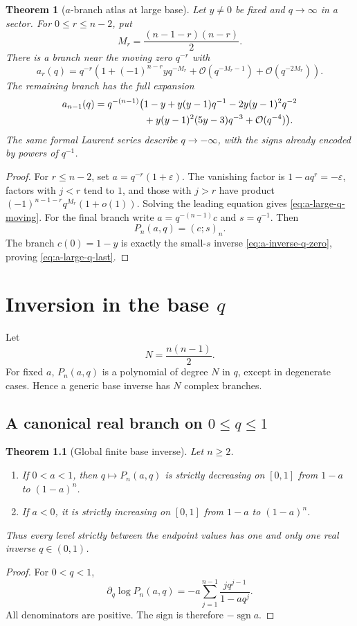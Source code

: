 \documentclass[11pt,oneside]{book}
\newtheorem{theorem}{Theorem}[chapter]
\theoremstyle{definition}
\theoremstyle{remark}
\newcommand{\OO}{\mathcal{O}}
\newcommand{\eps}{\varepsilon}
\begin{document}
\begin{theorem}[$a$-branch atlas at large base]\label{thm:a-branches-infty}
Let $y\ne0$ be fixed and $q\to\infty$ in a sector.  For
$0\le r\le n-2$, put
\[
 M_r=\frac{(n-1-r)(n-r)}2.
\]
There is a branch near the moving zero $q^{-r}$ with
\begin{equation}\label{eq:a-large-q-moving}
 a_r(q)=q^{-r}\left(1+(-1)^{n-r}yq^{-M_r}
 +\OO(q^{-M_r-1})+\OO(q^{-2M_r})\right).
\end{equation}
The remaining branch has the full expansion
\begin{align}
 a_{n-1}(q)=q^{-(n-1)}\bigl(&1-y+y(y-1)q^{-1}
 -2y(y-1)^2q^{-2}\notag\\
 &+y(y-1)^2(5y-3)q^{-3}+\OO(q^{-4})\bigr).
 \label{eq:a-large-q-last}
\end{align}
The same formal Laurent series describe $q\to-\infty$, with the signs already
encoded by powers of $q^{-1}$.
\end{theorem}
\begin{proof}
For $r\le n-2$, set $a=q^{-r}(1+\eps)$.  The vanishing factor is
$1-aq^r=-\eps$, factors with $j<r$ tend to $1$, and those with $j>r$ have
product $(-1)^{n-1-r}q^{M_r}(1+o(1))$.  Solving the leading equation gives
\eqref{eq:a-large-q-moving}.  For the final branch write
$a=q^{-(n-1)}c$ and $s=q^{-1}$.  Then
\[
 P_n(a,q)=(c;s)_n.
\]
The branch $c(0)=1-y$ is exactly the small-$s$ inverse
\eqref{eq:a-inverse-q-zero}, proving \eqref{eq:a-large-q-last}.
\end{proof}

\chapter{Inversion in the base $q$}

Let
\[
 N=\frac{n(n-1)}2.
\]
For fixed $a$, $P_n(a,q)$ is a polynomial of degree $N$ in $q$, except in
degenerate cases.  Hence a generic base inverse has $N$ complex branches.

\section{A canonical real branch on $0\le q\le1$}
\begin{theorem}[Global finite base inverse]\label{thm:global-q-finite}
Let $n\ge2$.
\begin{enumerate}
\item If $0<a<1$, then $q\mapsto P_n(a,q)$ is strictly decreasing on
$[0,1]$ from $1-a$ to $(1-a)^n$.
\item If $a<0$, it is strictly increasing on $[0,1]$ from $1-a$ to
$(1-a)^n$.
\end{enumerate}
Thus every level strictly between the endpoint values has one and only one
real inverse $q\in(0,1)$.
\end{theorem}
\begin{proof}
For $0<q<1$,
\[
 \partial_q\log P_n(a,q)
 =-a\sum_{j=1}^{n-1}\frac{j q^{j-1}}{1-aq^j}.
\]
All denominators are positive.  The sign is therefore $-\operatorname{sgn}a$.
\end{proof}
\end{document}
